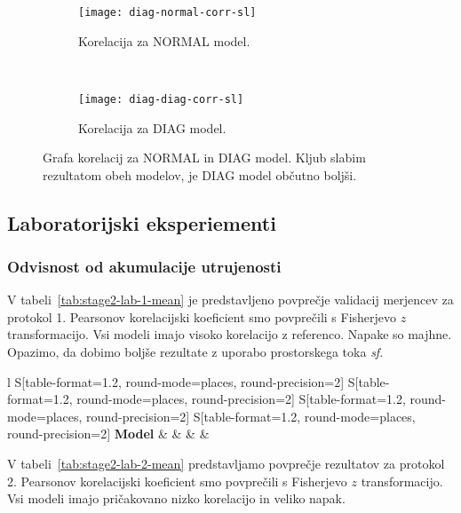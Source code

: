 \begin{figure}[!htb]
	\centering
	\begin{subfigure}[t]{0.45\columnwidth}
		\texttt{[image: diag-normal-corr-sl]}
		\caption{Korelacija za NORMAL model.}
		\label{fig:corr-diag-normal}
	\end{subfigure}
	~
	\begin{subfigure}[t]{0.45\columnwidth}
		\texttt{[image: diag-diag-corr-sl]}
		\caption{Korelacija za DIAG model.}
		\label{fig:corr-diag-diag}
	\end{subfigure}
	\caption[]{Grafa korelacij za NORMAL in DIAG model. Kljub slabim rezultatom obeh modelov, je DIAG model občutno boljši.}
	\label{fig:corr-diag}
\end{figure}


\subsection{Laboratorijski eksperiementi}
\subsubsection{Odvisnost od akumulacije utrujenosti}
V tabeli~\ref{tab:stage2-lab-1-mean} je predstavljeno povprečje validacij merjencev za protokol 1. Pearsonov korelacijski koeficient \corr smo povprečili s Fisherjevo $z$ transformacijo. Vsi modeli imajo visoko korelacijo z referenco. Napake so majhne. Opazimo, da dobimo boljše rezultate z uporabo prostorskega toka \textit{sf}.

\begin{table}[!htbp]
	\centering
	\begin{tabular}{l S[table-format=1.2, round-mode=places, round-precision=2] S[table-format=1.2, round-mode=places, round-precision=2] S[table-format=1.2, round-mode=places, round-precision=2] S[table-format=1.2, round-mode=places, round-precision=2]}
		\toprule
		\textbf{Model} & \thead{\corr} & \thead{\rae} & \thead{\rrse} & \theadm{\nsv}\\
		\midrule
		\bottomrule
	\end{tabular}
	\caption[Povprečje validacij merjencev za protokol 1 2. faze lab. eksperimentov]{Povprečje validacij merjencev za protokol 1 druge faze laboratorijskih eksperimentov. \corr smo povprečili s Fisherjevo $z$ transformacijo.}
	\label{tab:stage2-lab-1-mean}
\end{table}

V tabeli~\ref{tab:stage2-lab-2-mean}  predstavljamo povprečje rezultatov za protokol 2. Pearsonov korelacijski koeficient \corr smo povprečili s Fisherjevo $z$ transformacijo. Vsi modeli imajo pričakovano nizko korelacijo in veliko napak.

